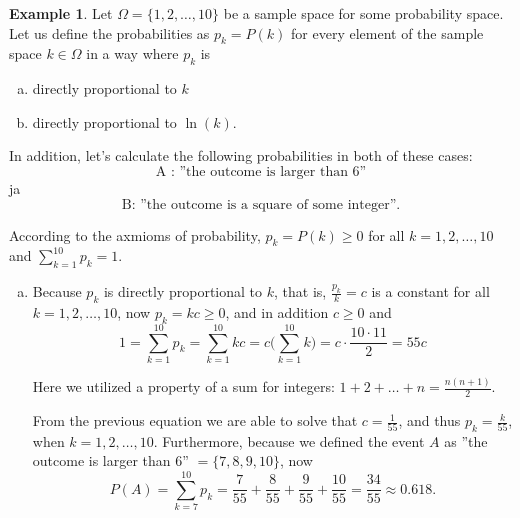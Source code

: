 \documentclass[12pt,a4paper,leqno]{report}
\theoremstyle{plain}
\theoremstyle{definition}
\newtheorem{esim}[equation]{Example}
\begin{document}
\begin{esim}
Let $\Omega = \{1,2, \ldots, 10 \}$ be a sample space for some probability space. Let us define the probabilities as $p_k = P(k)$ for every element of the sample space $k \in \Omega$ in a way where $p_k$ is
\begin{enumerate}[(a)]
\item directly proportional to $k$
\item directly proportional to $\ln(k)$.
\end{enumerate}
In addition, let's calculate the following probabilities in both of these cases:
\[
\text{A : ''the outcome is larger than 6''}
\]
ja 
\[
\text{B: ''the outcome is a square of some integer''}.
\]
\smallskip

According to the axmioms of probability, $p_k = P({k}) \geq 0$ for all $k = 1,2, \ldots, 10$ and $\sum_{k = 1}^{10} p_k = 1$.
\begin{enumerate}[(a)]
\item Because $p_k$ is directly proportional to $k$, that is, $\frac{p_k}{k} = c$ is a constant for all $k = 1,2, \ldots , 10$, now $p_k = kc \geq 0$, and in addition $c \geq 0$ and 
\[
1 = \sum_{k = 1}^{10} p_k = \sum_{k = 1}^{10} kc = c \Big( \sum_{k = 1}^{10} k \Big) = c \cdot \frac{10 \cdot 11}{2} = 55c
\]

Here we utilized a property of a sum for integers: $1+2+ \ldots + n = \frac{n(n+1)}{2}$. 

From the previous equation we are able to solve that $c = \frac{1}{55}$, and thus $p_k = \frac{k}{55}$, when $k = 1,2, \ldots, 10$. Furthermore, because we defined the event $A$ as ''the outcome is larger than 6'' $= \{7,8,9,10\}$, now
\[
P(A) = \sum_{k = 7}^{10}p_k = \frac{7}{55} + \frac{8}{55} + \frac{9}{55} + \frac{10}{55} = \frac{34}{55}  \approx 0.618.
\]


\end{enumerate}
\end{esim}
\end{document}
